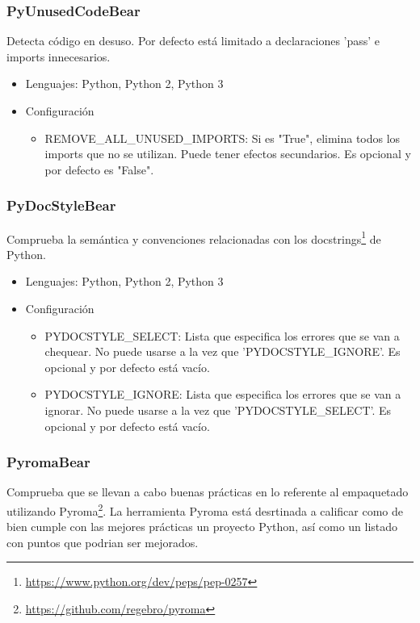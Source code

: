 \documentclass[a4paper, 12pt]{book}
\begin{document}
\subsubsection{PyUnusedCodeBear}
\label{sec:seccion1.2.11}
Detecta código en desuso. Por defecto está limitado a declaraciones 'pass' e imports innecesarios.

\begin{itemize}
  \item Lenguajes: Python, Python 2, Python 3
  \item Configuración
    \begin{itemize}
          \item REMOVE\_ALL\_UNUSED\_IMPORTS: Si es "True", elimina todos los imports que no se utilizan. Puede tener efectos secundarios. Es opcional y por defecto es "False".
    \end{itemize}
\end{itemize}

\subsubsection{PyDocStyleBear}
\label{sec:seccion1.2.12}
Comprueba la semántica y convenciones relacionadas con los docstrings\footnote{\url{https://www.python.org/dev/peps/pep-0257}} de Python.

\begin{itemize}
  \item Lenguajes: Python, Python 2, Python 3
  \item Configuración
    \begin{itemize}
          \item PYDOCSTYLE\_SELECT: Lista que especifica los errores que se van a chequear. No puede usarse a la vez que 'PYDOCSTYLE\_IGNORE'. Es opcional y por defecto está vacío.
          \item PYDOCSTYLE\_IGNORE: Lista que especifica los errores que se van a ignorar. No puede usarse a la vez que 'PYDOCSTYLE\_SELECT'. Es opcional y por defecto está vacío.
    \end{itemize}
\end{itemize}

\subsubsection{PyromaBear}
\label{sec:seccion1.2.13}
Comprueba que se llevan a cabo buenas prácticas en lo referente al empaquetado utilizando Pyroma\footnote{\url{https://github.com/regebro/pyroma}}. La herramienta Pyroma está desrtinada a calificar como de bien cumple con las mejores prácticas un proyecto Python, así como un listado con puntos que podrian ser mejorados.
\end{document}
